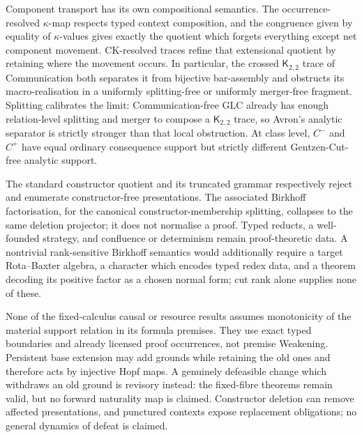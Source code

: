 \documentclass[10pt,a4paper]{article}
\theoremstyle{plain}
\theoremstyle{definition}
\theoremstyle{remark}
\begin{document}
Component transport has its own compositional semantics.  The
occurrence-resolved \(\kappa\)-map respects typed context composition,
and the congruence given by equality of \(\kappa\)-values gives exactly the
quotient which forgets
everything except net component movement.  CK-resolved traces refine that
extensional quotient by retaining where the movement occurs.  In
particular, the crossed \(\mathsf K_{2,2}\) trace of Communication both
separates it from bijective bar-assembly and obstructs its macro-realisation
in a uniformly splitting-free or uniformly merger-free fragment.
Splitting calibrates the limit:
Communication-free GLC already has enough relation-level splitting and
merger to compose a \(\mathsf K_{2,2}\) trace, so Avron's analytic
separator is strictly stronger than that local obstruction.  At class
level, \(C^-\) and \(C^+\) have equal ordinary
consequence support but strictly different Gentzen-Cut-free analytic
support.

The standard constructor quotient and its truncated grammar respectively
reject and enumerate constructor-free presentations.  The associated
Birkhoff
factorisation, for the canonical constructor-membership splitting,
collapses to the same deletion projector; it does not normalise a proof.
Typed reducts, a well-founded strategy, and confluence or determinism
remain proof-theoretic data.  A nontrivial rank-sensitive Birkhoff semantics
would additionally require a target Rota--Baxter algebra, a character which
encodes typed redex data, and a theorem decoding its positive factor as a
chosen normal form; cut rank alone supplies none of these.

None of the fixed-calculus causal or resource results assumes monotonicity
of the material support relation in its formula premises.  They use exact
typed boundaries and already licensed proof occurrences, not premise
Weakening.  Persistent base extension may add grounds while retaining the
old ones and therefore acts by injective Hopf maps.  A genuinely defeasible
change which withdraws an old ground is revisory instead: the fixed-fibre
theorems remain valid, but no forward naturality map is claimed.  Constructor
deletion can remove affected presentations, and punctured contexts expose
replacement obligations; no general dynamics of defeat is claimed.
\end{document}
